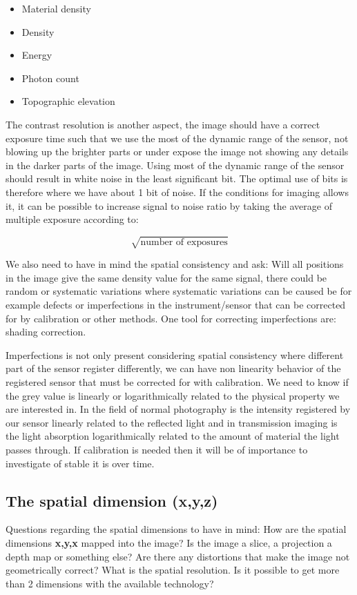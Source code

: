 \begin{itemize}
	\item Material density
	\item Density
	\item Energy
	\item Photon count
	\item Topographic elevation
\end{itemize}

The contrast resolution is another aspect, the image should have a correct exposure time such that we use the most of the dynamic range of the sensor, not blowing up the brighter parts or under expose the image not showing any details in the darker parts of the image. Using most of the dynamic range of the sensor should result in white noise in the least significant bit. The optimal use of bits is therefore where we have about 1 bit of noise. If the conditions for imaging allows it, it can be possible to increase signal to noise ratio by taking the average of multiple exposure according to:

\begin{equation}
	\sqrt{\text{number of exposures}}	
\end{equation}

We also need to have in mind the spatial consistency and ask: Will all positions in the image give the same density value for the same signal, there could be random or systematic variations where systematic variations can be caused be for example defects or imperfections in the instrument/sensor that can be corrected for by calibration or other methods. One tool for correcting imperfections are: shading correction.

Imperfections is not only present considering spatial consistency where different part of the sensor register differently, we can have non linearity behavior of the registered sensor that must be corrected for with calibration. We need to know if the grey value is linearly or logarithmically  related to the physical property we are interested in. In the field of normal photography is the intensity registered by our sensor linearly related to the reflected light and in transmission imaging is the light absorption logarithmically related to the amount of material the light passes through. If calibration is needed then it will be of importance to investigate of stable it is over time. 

\subsection*{The spatial dimension (x,y,z)}
Questions regarding the spatial dimensions to have in mind: How are the spatial dimensions \textbf{x,y,x} mapped into the image? Is the image a slice, a projection a depth map or something else? Are there any distortions that make the image not geometrically correct? What is the spatial resolution. Is it possible to get more than 2 dimensions with the available technology? 

